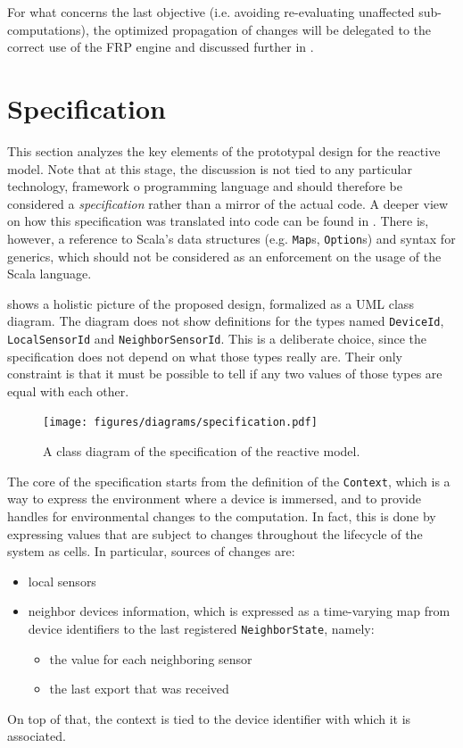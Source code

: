 For what concerns the last objective (i.e. avoiding re-evaluating unaffected sub-computations), the optimized propagation of changes will be delegated to the correct use of the FRP engine and discussed further in .

\section{Specification}
\label{sec:specification}

This section analyzes the key elements of the prototypal design for the reactive model.
%
Note that at this stage, the discussion is not tied to any particular technology, framework o programming language and should therefore be considered a \textit{specification} rather than a mirror of the actual code.
%
A deeper view on how this specification was translated into code can be found in .
% 
There is, however, a reference to Scala's data structures (e.g. \texttt{Map}s, \texttt{Option}s) and syntax for generics, which should not be considered as an enforcement on the usage of the Scala language.

 shows a holistic picture of the proposed design, formalized as a UML class diagram.
%
The diagram does not show definitions for the types named \texttt{DeviceId}, \texttt{LocalSensorId} and \texttt{NeighborSensorId}.
%
This is a deliberate choice, since the specification does not depend on what those types really are.
%
Their only constraint is that it must be possible to tell if any two values of those types are equal with each other.
%
\begin{figure}
    \centering
    \texttt{[image: figures/diagrams/specification.pdf]}
    \caption{A class diagram of the specification of the reactive model.}
    \label{fig:class-diagram}
\end{figure}

The core of the specification starts from the definition of the \texttt{Context}, which is a way to express the environment where a device is immersed, and to provide handles for environmental changes to the computation.
%
In fact, this is done by expressing values that are subject to changes throughout the lifecycle of the system as cells.
%
In particular, sources of changes are:
%
\begin{itemize}
    \item local sensors
    \item neighbor devices information, which is expressed as a time-varying map from device identifiers to the last registered \texttt{NeighborState}, namely:
    \begin{itemize}
        \item the value for each neighboring sensor
        \item the last export that was received
    \end{itemize}
\end{itemize}
%
On top of that, the context is tied to the device identifier with which it is associated.

